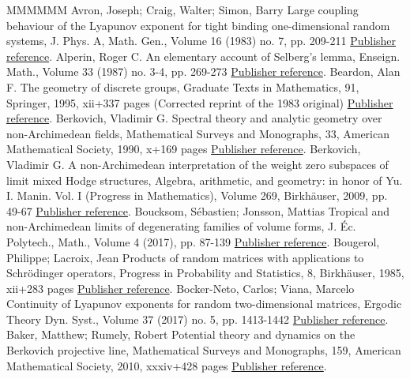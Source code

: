 \begin{thebibliography}{MMMMMM}
 Avron, Joseph; Craig, Walter; Simon, Barry Large coupling behaviour of the Lyapunov exponent for tight binding one-dimensional random systems, J. Phys. A, Math. Gen., Volume 16 (1983) no. 7, pp. 209-211 \href{https://ahl.centre-mersenne.org/item/AHL_2019__2__515_0/#avron-craig-simon}{Publisher reference}.
 Alperin, Roger C. An elementary account of Selberg’s lemma, Enseign. Math., Volume 33 (1987) no. 3-4, pp. 269-273 \href{https://ahl.centre-mersenne.org/item/AHL_2019__2__515_0/#alperin}{Publisher reference}.
 Beardon, Alan F. The geometry of discrete groups, Graduate Texts in Mathematics, 91, Springer, 1995, xii+337 pages (Corrected reprint of the 1983 original) \href{https://ahl.centre-mersenne.org/item/AHL_2019__2__515_0/#beardon}{Publisher reference}.
 Berkovich, Vladimir G. Spectral theory and analytic geometry over non-Archimedean fields, Mathematical Surveys and Monographs, 33, American Mathematical Society, 1990, x+169 pages \href{https://ahl.centre-mersenne.org/item/AHL_2019__2__515_0/#Ber}{Publisher reference}.
 Berkovich, Vladimir G. A non-Archimedean interpretation of the weight zero subspaces of limit mixed Hodge structures, Algebra, arithmetic, and geometry: in honor of Yu. I. Manin. Vol. I (Progress in Mathematics), Volume 269, Birkhäuser, 2009, pp. 49-67 \href{https://ahl.centre-mersenne.org/item/AHL_2019__2__515_0/#berko}{Publisher reference}.
 Boucksom, Sébastien; Jonsson, Mattias Tropical and non-Archimedean limits of degenerating families of volume forms, J. Éc. Polytech., Math., Volume 4 (2017), pp. 87-139 \href{https://ahl.centre-mersenne.org/item/AHL_2019__2__515_0/#boucksom-jonsson}{Publisher reference}.
 Bougerol, Philippe; Lacroix, Jean Products of random matrices with applications to Schrödinger operators, Progress in Probability and Statistics, 8, Birkhäuser, 1985, xii+283 pages \href{https://ahl.centre-mersenne.org/item/AHL_2019__2__515_0/#bougerol-lacroix}{Publisher reference}.
 Bocker-Neto, Carlos; Viana, Marcelo Continuity of Lyapunov exponents for random two-dimensional matrices, Ergodic Theory Dyn. Syst., Volume 37 (2017) no. 5, pp. 1413-1442 \href{https://ahl.centre-mersenne.org/item/AHL_2019__2__515_0/#bocker-viana}{Publisher reference}.
 Baker, Matthew; Rumely, Robert Potential theory and dynamics on the Berkovich projective line, Mathematical Surveys and Monographs, 159, American Mathematical Society, 2010, xxxiv+428 pages \href{https://ahl.centre-mersenne.org/item/AHL_2019__2__515_0/#baker-rumely}{Publisher reference}.

\end{thebibliography}
